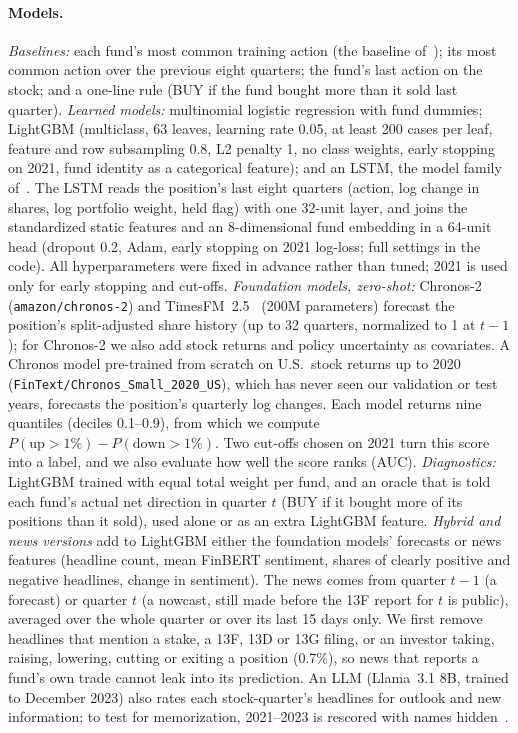 \paragraph{Models.} \emph{Baselines:} each fund's most common training action
(the baseline of~\cite{cohen2026mimicking}); its most common action over the
previous eight quarters; the fund's last action on the stock; and a one-line
rule (BUY if the fund bought more than it sold last quarter).
\emph{Learned models:} multinomial logistic regression with fund dummies;
LightGBM (multiclass, 63 leaves, learning rate 0.05, at least 200 cases per
leaf, feature and row subsampling 0.8, L2 penalty 1, no class weights, early
stopping on 2021, fund identity as a categorical feature); and an LSTM, the
model family of~\cite{cohen2026mimicking}. The LSTM reads the position's last
eight quarters (action, log change in shares, log portfolio weight, held flag)
with one 32-unit layer, and joins the standardized static features and an
8-dimensional fund embedding in a 64-unit head (dropout 0.2, Adam, early
stopping on 2021 log-loss; full settings in the code). All hyperparameters were fixed in advance rather than
tuned; 2021 is used only for early stopping and cut-offs.
\emph{Foundation models, zero-shot:} Chronos-2~\cite{ansari2025chronos2}
(\texttt{amazon/chronos-2}) and TimesFM~2.5~\cite{das2024timesfm} (200M
parameters) forecast the position's split-adjusted share history (up to 32
quarters, normalized to 1 at $t-1$); for Chronos-2 we also add stock returns
and policy uncertainty as covariates. A Chronos model pre-trained from scratch
on U.S.\ stock returns up to 2020~\cite{rahimikia2025tsfm}
(\texttt{FinText/Chronos\_Small\_2020\_US}), which has never seen our
validation or test years, forecasts the position's quarterly log changes.
Each model returns nine quantiles (deciles 0.1--0.9), from which we compute
$P(\text{up}>1\%) - P(\text{down}>1\%)$. Two cut-offs chosen on 2021 turn this
score into a label, and we also evaluate how well the score ranks (AUC).
\emph{Diagnostics:} LightGBM trained with equal total weight per fund, and an oracle that is told each fund's
actual net direction in quarter $t$ (BUY if it bought more of its positions
than it sold), used alone or as an extra LightGBM feature.
\emph{Hybrid and news versions} add to LightGBM either the foundation models'
forecasts or news features (headline count, mean FinBERT sentiment, shares of
clearly positive and negative headlines, change in sentiment). The news comes
from quarter $t-1$ (a forecast) or quarter $t$ (a nowcast, still made before
the 13F report for $t$ is public), averaged over the whole quarter or over its
last 15 days only. We first remove headlines that mention a stake, a 13F, 13D
or 13G filing, or an investor taking, raising, lowering, cutting or exiting a
position (0.7\%), so news that reports a fund's own trade cannot leak into
its prediction. An LLM (Llama~3.1 8B, trained to December 2023) also rates
each stock-quarter's headlines for outlook and new information; to test for
memorization, 2021--2023 is rescored with names hidden~\cite{gao2025lookahead}.

